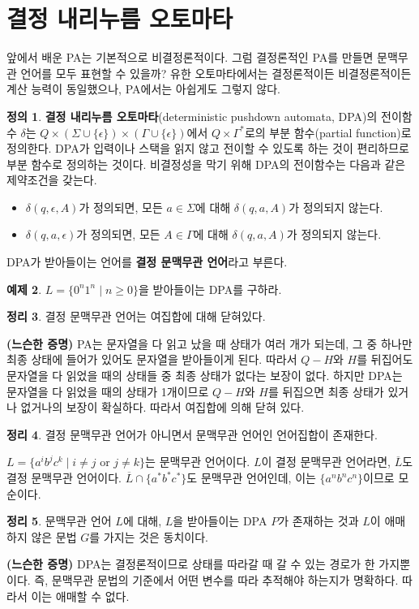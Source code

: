 \documentclass[b5paper, 11pt]{book}
\theoremstyle{definition}
\newtheorem{defn}{정의}[chapter]
\newtheorem{thm}[defn]{정리}
\newtheorem{ex}[defn]{예제}
\newenvironment{pf*}{\pushQED{\qed}\pf}
{\popQED\endpf}
\begin{document}
\section{결정 내리누름 오토마타}
앞에서 배운 PA는 기본적으로 비결정론적이다. 그럼 결정론적인 PA를 만들면 문맥무관 언어를 모두 표현할 수 있을까? 유한 오토마타에서는 결정론적이든 비결정론적이든 계산 능력이 동일했으나, PA에서는 아쉽게도 그렇지 않다. 
\begin{defn}
    \textbf{결정 내리누름 오토마타}(deterministic pushdown automata, DPA)의 전이함수 $\delta$는 $Q \times (\Sigma\cup \{\epsilon\}) \times (\Gamma \cup \{\epsilon\})$에서 $Q \times \Gamma^*$로의 부분 함수(partial function)로 정의한다. DPA가 입력이나 스택을 읽지 않고 전이할 수 있도록 하는 것이 편리하므로 부분 함수로 정의하는 것이다. 비결정성을 막기 위해 DPA의 전이함수는 다음과 같은 제약조건을 갖는다. 
\begin{itemize}
    \item $\delta(q,\epsilon,A)$가 정의되면, 모든 $a \in \Sigma$에 대해 $\delta(q,a,A)$가 정의되지 않는다.
    \item $\delta(q,a,\epsilon)$가 정의되면, 모든 $A \in \Gamma$에 대해 $\delta(q,a,A)$가 정의되지 않는다. 
\end{itemize}
DPA가 받아들이는 언어를 \textbf{결정 문맥무관 언어}라고 부른다. 
\end{defn}
\begin{ex}
    $L = \{0^n1^n \;\vert\; n \ge 0\}$을 받아들이는 DPA를 구하라. 
\end{ex}
\begin{thm}
    결정 문맥무관 언어는 여집합에 대해 닫혀있다. 
\end{thm}
\begin{pf*}
    \textbf{(느슨한 증명)} PA는 문자열을 다 읽고 났을 때 상태가 여러 개가 되는데, 그 중 하나만 최종 상태에 들어가 있어도 문자열을 받아들이게 된다. 따라서 $Q-H$와 $H$를 뒤집어도 문자열을 다 읽었을 때의 상태들 중 최종 상태가 없다는 보장이 없다. 하지만 DPA는 문자열을 다 읽었을 때의 상태가 1개이므로 $Q-H$와 $H$를 뒤집으면 최종 상태가 있거나 없거나의 보장이 확실하다. 따라서 여집합에 의해 닫혀 있다.
\end{pf*}
\begin{thm}
    결정 문맥무관 언어가 아니면서 문맥무관 언어인 언어집합이 존재한다. 
\end{thm}
\begin{pf*}
    $L = \{ a^i b^j c^k \;\vert\; i \neq j \text{ or } j \neq k \}$는 문맥무관 언어이다. $L$이 결정 문맥무관 언어라면, $\overline{L}$도 결정 문맥무관 언어이다. $\overline{L} \cap \{a^*b^*c^*\}$도 문맥무관 언어인데, 이는 $\{a^nb^nc^n\}$이므로 모순이다.
\end{pf*}
\begin{thm}
    문맥무관 언어 $L$에 대해, $L$을 받아들이는 DPA $P$가 존재하는 것과 $L$이 애매하지 않은 문법 $G$를 가지는 것은 동치이다. 
\end{thm}
\begin{pf*}
    \textbf{(느슨한 증명)} DPA는 결정론적이므로 상태를 따라갈 때 갈 수 있는 경로가 한 가지뿐이다. 즉, 문맥무관 문법의 기준에서 어떤 변수를 따라 추적해야 하는지가 명확하다. 따라서 이는 애매할 수 없다.
\end{pf*}
\end{document}
